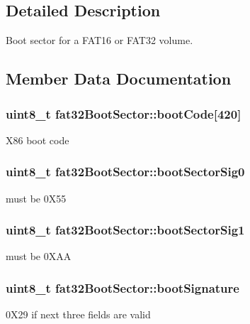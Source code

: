 \subsection{Detailed Description}
Boot sector for a F\+A\+T16 or F\+A\+T32 volume. 

\subsection{Member Data Documentation}
\hypertarget{structfat32_boot_sector_a7a845a41d575937bb7aac2c5204a6e1d}{}
\subsubsection[{boot\+Code}]{\setlength{\rightskip}{0pt plus 5cm}uint8\+\_\+t fat32\+Boot\+Sector\+::boot\+Code\mbox{[}420\mbox{]}}\label{structfat32_boot_sector_a7a845a41d575937bb7aac2c5204a6e1d}
X86 boot code \hypertarget{structfat32_boot_sector_aea26006be62f6bbca4637e359ce85e40}{}
\subsubsection[{boot\+Sector\+Sig0}]{\setlength{\rightskip}{0pt plus 5cm}uint8\+\_\+t fat32\+Boot\+Sector\+::boot\+Sector\+Sig0}\label{structfat32_boot_sector_aea26006be62f6bbca4637e359ce85e40}
must be 0\+X55 \hypertarget{structfat32_boot_sector_a92816cfa0d97e94c46eaff1ccc92f1fa}{}
\subsubsection[{boot\+Sector\+Sig1}]{\setlength{\rightskip}{0pt plus 5cm}uint8\+\_\+t fat32\+Boot\+Sector\+::boot\+Sector\+Sig1}\label{structfat32_boot_sector_a92816cfa0d97e94c46eaff1ccc92f1fa}
must be 0\+X\+A\+A \hypertarget{structfat32_boot_sector_a1a06079dbeb74e505689a56ab08c05a7}{}
\subsubsection[{boot\+Signature}]{\setlength{\rightskip}{0pt plus 5cm}uint8\+\_\+t fat32\+Boot\+Sector\+::boot\+Signature}\label{structfat32_boot_sector_a1a06079dbeb74e505689a56ab08c05a7}
0\+X29 if next three fields are valid \hypertarget{structfat32_boot_sector_a01848fd44bea48d521bf13dcc8d69c95}{}
